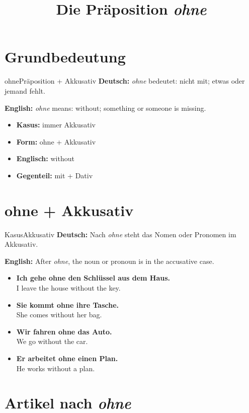 \documentclass[a4paper,11pt]{article}
\title{Die Präposition \textit{ohne}}
\date{}
\newcommand{\GermanText}[1]{\textbf{Deutsch: }#1\par}
\newcommand{\EnglishText}[1]{{\small\color{SoftGray}\textbf{English: }#1\par}}
\newcommand{\ExampleItem}[2]{\item \textbf{#1}\\{\small\color{SoftGray}#2}}
\begin{document}
    \maketitle
    \tableofcontents
    \newpage

\section{Grundbedeutung}

\begin{grammarentry}{ohne}{Präposition + Akkusativ}
\GermanText{\textit{ohne} bedeutet: nicht mit; etwas oder jemand fehlt.}
\EnglishText{\textit{ohne} means: without; something or someone is missing.}

\begin{itemize}
    \item \textbf{Kasus:} immer Akkusativ
    \item \textbf{Form:} ohne + Akkusativ
    \item \textbf{Englisch:} without
    \item \textbf{Gegenteil:} mit + Dativ
\end{itemize}
\end{grammarentry}

\section{ohne + Akkusativ}

\begin{grammarentry}{Kasus}{Akkusativ}
\GermanText{Nach \textit{ohne} steht das Nomen oder Pronomen im Akkusativ.}
\EnglishText{After \textit{ohne}, the noun or pronoun is in the accusative case.}

\begin{exbox}
\begin{itemize}
    \ExampleItem{Ich gehe ohne den Schlüssel aus dem Haus.}{I leave the house without the key.}
    \ExampleItem{Sie kommt ohne ihre Tasche.}{She comes without her bag.}
    \ExampleItem{Wir fahren ohne das Auto.}{We go without the car.}
    \ExampleItem{Er arbeitet ohne einen Plan.}{He works without a plan.}
\end{itemize}
\end{exbox}
\end{grammarentry}

\section{Artikel nach \textit{ohne}}
\end{document}
